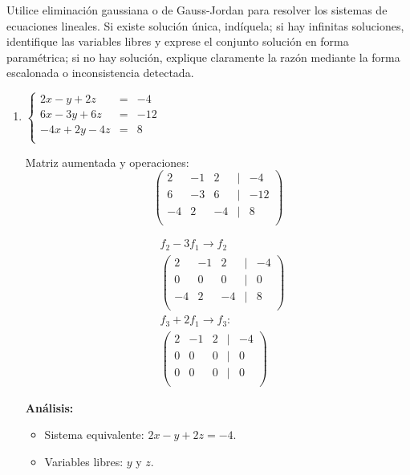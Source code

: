 \begin{prob} 
Utilice eliminación gaussiana o de Gauss-Jordan para resolver los sistemas de ecuaciones lineales. Si existe solución única, indíquela; si hay infinitas soluciones, identifique las variables libres y exprese el conjunto solución en forma paramétrica; si no hay solución, explique claramente la razón mediante la forma escalonada o inconsistencia detectada.

    \begin{enumerate}[$a)$]
    \item  $\left\lbrace \begin{array}{ccc}
2x-y+2z&=&-4\\
6x-3y+6z&=&-12\\
-4x+2y-4z&=&8\\
\end{array} \right. $ 
    
    \begin{myproof}
    Matriz aumentada y operaciones:
    \[
    \begin{pmatrix}
    2 & -1 & 2 & | & -4 \\
    6 & -3 & 6 & | & -12 \\
    -4 & 2 & -4 & | & 8 \\
    \end{pmatrix}
    \]
    
    \begin{align*}
    &f_2 - 3f_1\to f_2 \\
    &\begin{pmatrix}
    2 & -1 & 2 & | & -4 \\
    0 & 0 & 0 & | & 0 \\
    -4 & 2 & -4 & | & 8 \\
    \end{pmatrix} \\
    &f_3 + 2f_1\to f_3: \\
    &\begin{pmatrix}
    2 & -1 & 2 & | & -4 \\
    0 & 0 & 0 & | & 0 \\
    0 & 0 & 0 & | & 0 \\
    \end{pmatrix}
    \end{align*}
    
    \textbf{Análisis:} 
    \begin{itemize}
    \item Sistema equivalente: $2x - y + 2z = -4$.
    \item Variables libres: $y$ y $z$.
    \end{itemize}
    

\end{myproof}
\end{enumerate}
\end{prob}
